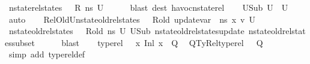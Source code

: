 \begin{isabellebody}
\ {\isacartoucheopen}nstate{\isacharunderscore}{\kern0pt}rel{\isacharunderscore}{\kern0pt}states\ {\isasymLambda}\ {\isasymLambda}{\isacharprime}{\kern0pt}\ R\ ns\ U{}{\isacartoucheclose}\isanewline
\ \ \ \ \isamarkupfalse%
\ {\isacharparenleft}{\kern0pt}blast\ dest{\isacharcolon}{\kern0pt}\ havoc{\isacharunderscore}{\kern0pt}nstate{\isacharunderscore}{\kern0pt}rel{\isacharparenright}{\kern0pt}\isanewline
\ \ \isamarkupfalse%
\ U{}Sub{\isacharcolon}{\kern0pt}\ {\isachardoublequoteopen}{\isacharquery}{\kern0pt}U{}\ {\isasymsubseteq}\ U{}{\isachardoublequoteclose}\ \isamarkupfalse%
\ auto\isanewline
\ \ \isamarkupfalse%
\ RelOldU{}{\isacharcolon}{\kern0pt}{\isachardoublequoteopen}nstate{\isacharunderscore}{\kern0pt}old{\isacharunderscore}{\kern0pt}rel{\isacharunderscore}{\kern0pt}states\ {\isasymLambda}\ {\isasymLambda}{\isacharprime}{\kern0pt}\ R{\isacharunderscore}{\kern0pt}old\ {\isacharparenleft}{\kern0pt}update{\isacharunderscore}{\kern0pt}var\ {\isasymLambda}\ ns\ x\ v{\isacharparenright}{\kern0pt}\ {\isacharquery}{\kern0pt}U{}{\isachardoublequoteclose}\ \isanewline
\ \ \ \ \isamarkupfalse%
\ {\isacartoucheopen}nstate{\isacharunderscore}{\kern0pt}old{\isacharunderscore}{\kern0pt}rel{\isacharunderscore}{\kern0pt}states\ {\isasymLambda}\ {\isasymLambda}{\isacharprime}{\kern0pt}\ R{\isacharunderscore}{\kern0pt}old\ ns\ U{}{\isacartoucheclose}\ U{}Sub\ nstate{\isacharunderscore}{\kern0pt}old{\isacharunderscore}{\kern0pt}rel{\isacharunderscore}{\kern0pt}states{\isacharunderscore}{\kern0pt}update\ nstate{\isacharunderscore}{\kern0pt}old{\isacharunderscore}{\kern0pt}rel{\isacharunderscore}{\kern0pt}states{\isacharunderscore}{\kern0pt}subset\isanewline
\ \ \ \ \isamarkupfalse%
\ blast\isanewline
\ \ \isamarkupfalse%
\ {\isacartoucheopen}type{\isacharunderscore}{\kern0pt}rel\ {\isasymLambda}\ {\isasymLambda}{\isacharprime}{\kern0pt}\ {\isacharparenleft}{\kern0pt}{\isacharparenleft}{\kern0pt}x{\isacharcomma}{\kern0pt}\ Inl\ x{\isacharprime}{\kern0pt}{\isacharparenright}{\kern0pt}\ {\isacharhash}{\kern0pt}\ Q{\isacharparenright}{\kern0pt}{\isacartoucheclose}\ \isamarkupfalse%
\ QTyRel{\isacharcolon}{\kern0pt}{\isachardoublequoteopen}type{\isacharunderscore}{\kern0pt}rel\ {\isasymLambda}\ {\isasymLambda}{\isacharprime}{\kern0pt}\ Q{\isachardoublequoteclose}\ \isamarkupfalse%
\ {\isacharparenleft}{\kern0pt}simp\ add{\isacharcolon}{\kern0pt}\ type{\isacharunderscore}{\kern0pt}rel{\isacharunderscore}{\kern0pt}def{\isacharparenright}{\kern0pt}\isanewline

\end{isabellebody}
